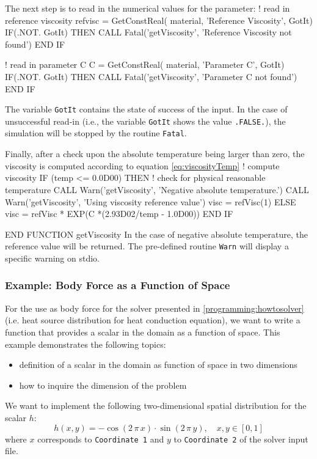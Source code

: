 \noindent The next step is to read in the numerical values for the parameter:
\ttbegin
  ! read in reference viscosity
  refvisc = GetConstReal( material, 'Reference Viscosity', GotIt)
  IF(.NOT. GotIt) THEN
     CALL Fatal('getViscosity', 'Reference Viscosity not found')
  END IF

  ! read in parameter C
  C = GetConstReal( material, 'Parameter C', GotIt)
  IF(.NOT. GotIt) THEN
     CALL Fatal('getViscosity', 'Parameter C not found')
  END IF

\ttend
The variable \texttt{GotIt} contains the state of success of the input. In the case of unsuccessful read-in (i.e., the variable \texttt{GotIt} shows the value \texttt{.FALSE.}), the simulation will be stopped by the routine \texttt{Fatal}.

\noindent Finally, after a check upon the absolute temperature being larger than zero, the viscosity is computed according to equation \eqref{eq:viscosityTemp}
\ttbegin
  ! compute viscosity
  IF (temp <= 0.0D00) THEN ! check for physical reasonable temperature
     CALL Warn('getViscosity', 'Negative absolute temperature.')
     CALL Warn('getViscosity', 'Using viscosity reference value')
     visc = refVisc(1)
  ELSE  
     visc = refVisc * EXP(C *(2.93D02/temp - 1.0D00))
  END IF

END FUNCTION getViscosity
\ttend
In the case of negative absolute temperature, the reference value will be returned. The pre-defined routine \texttt{Warn} will display a specific warning on stdio.
\subsubsection{Example: Body Force as a Function of Space}
For the use as body force for the solver presented in \ref{programming:howtosolver} (i.e. heat source distribution for heat conduction equation), we want to write a function that provides a scalar in the domain as a function of space. This example demonstrates the following topics:
\begin{itemize}
   \item definition of a scalar in the domain as function of space in two dimensions
   \item how to inquire the dimension of the problem
\end{itemize}
\noindent We want to implement the following two-dimensional spatial distribution for the scalar $h$:
\begin{equation}  
\label{eq:loadDist}
h(x,y) = -\cos(2\,\pi\,x)\cdot\sin(2\,\pi\,y),\quad x,y \in [0,1]
\end{equation}
where $x$ corresponds to \texttt{Coordinate 1} and $y$ to \texttt{Coordinate 2} of the solver input file.


